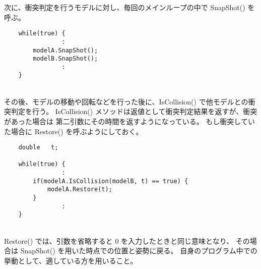 次に、衝突判定を行うモデルに対し、毎回のメインループの中で SnapShot() を呼ぶ。
\\
\begin{breakbox}
\begin{verbatim}
    while(true) {
                :
        modelA.SnapShot();
        modelB.SnapShot();
                :
    }
\end{verbatim}
\end{breakbox}
~ \\
その後、モデルの移動や回転などを行った後に、IsCollision() で他モデルとの衝突判定を行う。
IsCollision() メソッドは返値として衝突判定結果を返すが、衝突があった場合は
第二引数にその時間を返すようになっている。
もし衝突していた場合に Restore() を呼ぶようにしておく。
\\
\begin{breakbox}
\begin{verbatim}
    double   t;

    while(true) {
                :
        if(modelA.IsCollision(modelB, t) == true) {
            modelA.Restore(t);
        }
                :
    }
\end{verbatim}
\end{breakbox}
~ \\
Restore() では、引数を省略すると 0 を入力したときと同じ意味となり、
その場合は SnapShot() を用いた時点での位置と姿勢に戻る。
自身のプログラム中での挙動として、適している方を用いること。
